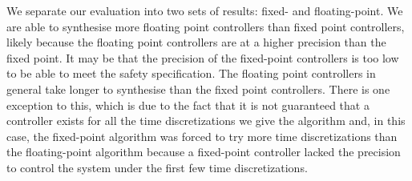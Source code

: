 \documentclass[twocolumn]{autart}    %
\renewcommand{\note}[1]{\textcolor{red}{[#1]}}
\begin{document}
We separate our evaluation into two sets of results: fixed- and floating-point. 
We are able to synthesise more floating point controllers than fixed point controllers, likely because the
floating point controllers are at a higher precision than the fixed point. It may be that the precision of the fixed-point
controllers is too low to be able to meet the safety specification. The floating point controllers in general take longer to synthesise
than the fixed point controllers. There is one exception to this, which is due to the fact that it is not guaranteed that a controller
exists for all the time discretizations we give the algorithm and, in this case, the fixed-point algorithm was forced to try more time discretizations
than the floating-point algorithm
because a fixed-point controller lacked the precision to control the system under the first few time discretizations. 
\end{document}
